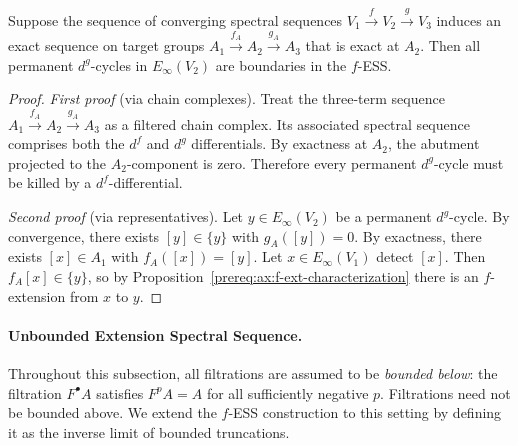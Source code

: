 \begin{axiom}\label{prereq:ax:ess-exactness}
    \notready
    Suppose the sequence of converging spectral sequences $V_1 \xrightarrow{f} V_2 \xrightarrow{g} V_3$ induces an exact sequence on target groups $A_1 \xrightarrow{f_A} A_2 \xrightarrow{g_A} A_3$ that is exact at $A_2$. Then all permanent $d^g$-cycles in $E_\infty(V_2)$ are boundaries in the $f$-ESS.
\end{axiom}
\begin{proof}\leanok
    \emph{First proof} (via chain complexes). Treat the three-term sequence $A_1 \xrightarrow{f_A} A_2 \xrightarrow{g_A} A_3$ as a filtered chain complex. Its associated spectral sequence comprises both the $d^f$ and $d^g$ differentials. By exactness at $A_2$, the abutment projected to the $A_2$-component is zero. Therefore every permanent $d^g$-cycle must be killed by a $d^f$-differential.

    \emph{Second proof} (via representatives). Let $y \in E_\infty(V_2)$ be a permanent $d^g$-cycle. By convergence, there exists $[y] \in \{y\}$ with $g_A([y]) = 0$. By exactness, there exists $[x] \in A_1$ with $f_A([x]) = [y]$. Let $x \in E_\infty(V_1)$ detect $[x]$. Then $f_A[x] \in \{y\}$, so by Proposition~\ref{prereq:ax:f-ext-characterization} there is an $f$-extension from $x$ to $y$.
\end{proof}

\paragraph{Unbounded Extension Spectral Sequence.}\label{sec:prereq-unbounded-ess}

Throughout this subsection, all filtrations are assumed to be \emph{bounded below}: the filtration $F^\bullet A$ satisfies $F^p A = A$ for all sufficiently negative $p$. Filtrations need not be bounded above. We extend the $f$-ESS construction to this setting by defining it as the inverse limit of bounded truncations.

